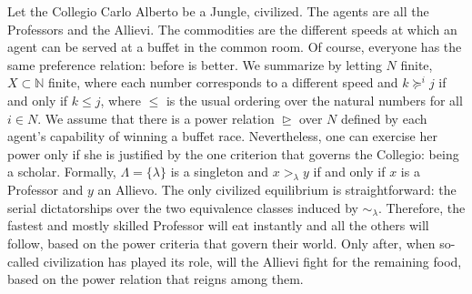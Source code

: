 \begin{example}\label{Example: CCA}
    Let the Collegio Carlo Alberto be a Jungle, civilized. The agents are all the Professors and the Allievi. The commodities are the different speeds at which an agent can be served at a buffet in the common room. Of course, everyone has the same preference relation: before is better. We summarize by letting $N$ finite, $X\subset\mathbb{N}$ finite, where each number corresponds to a different speed and $k\succeq^i j$ if and only if $k\leq j$, where $\leq$ is the usual ordering over the natural numbers for all $i\in N$. We assume that there is a power relation $\trianglerighteq$ over $N$ defined by each agent's capability of winning a buffet race. Nevertheless, one can exercise her power only if she is justified by the one criterion that governs the Collegio: being a scholar. Formally, $\Lambda=\{\lambda\}$ is a singleton and $x>_{\lambda}y$ if and only if $x$ is a Professor and $y$ an Allievo. The only civilized equilibrium is straightforward: the serial dictatorships over the two equivalence classes induced by $\sim_{\lambda}$. Therefore, the fastest and mostly skilled Professor will eat instantly and all the others will follow, based on the power criteria that govern their world. Only after, when so-called civilization has played its role, will the Allievi fight for the remaining food, based on the power relation that reigns among them. 

\end{example}


    


